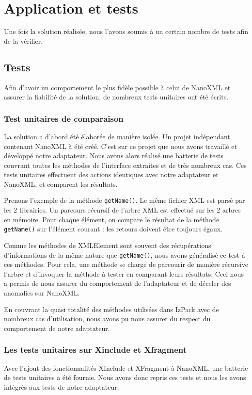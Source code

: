\section{Application et tests}
Une fois la solution réalisée, nous l'avons soumis à un certain nombre de tests afin de la vérifier.
\subsection{Tests}
Afin d'avoir un comportement le plus fidèle possible à celui de NanoXML et assurer la fiabilité de la solution, de nombreux tests unitaires ont été écrits.
\subsubsection{Test unitaires de comparaison}
La solution a d'abord été élaborée de manière isolée.
Un projet indépendant contenant NanoXML à été créé.
C'est sur ce projet que nous avons travaillé et développé notre adaptateur.
Nous avons alors réalisé une batterie de tests couvrant toutes les méthodes de l'interface extraites et de très nombreux cas.
Ces tests unitaires effectuent des actions identiques avec notre adaptateur et NanoXML, et comparent les résultats.

Prenons l'exemple de la méthode \verb|getName()|. Le même fichier XML est parsé par les 2 librairies.
Un parcours récursif de l'arbre XML est effectué sur les 2 arbres en mémoire.
Pour chaque élément, on compare le résultat de la méthode \verb|getName()| sur l'élément courant : les retours doivent être toujours égaux.

Comme les méthodes de XMLElement sont souvent des récupérations d'informations de la même nature que \verb|getName()|, nous avons généralisé ce test à ces méthodes.
Pour cela, une méthode se charge de parcourir de manière récursive l'arbre et d'invoquer la méthode à tester en comparant leurs résultats.
Ceci nous a permis de nous assurer du comportement de l'adaptateur et de déceler des anomalies sur NanoXML.

En couvrant la quasi totalité des méthodes utilisées dans IzPack avec de nombreux cas d'utilisation, nous avons pu nous assurer du respect du comportement de notre adaptateur.

\subsubsection{Les tests unitaires sur Xinclude et Xfragment}
Avec l'ajout des fonctionnalités XInclude et XFragment à NanoXML, une batterie de tests unitaires a été fournie.
Nous avons donc repris ces tests et nous les avons intégrés aux tests de notre adaptateur.

